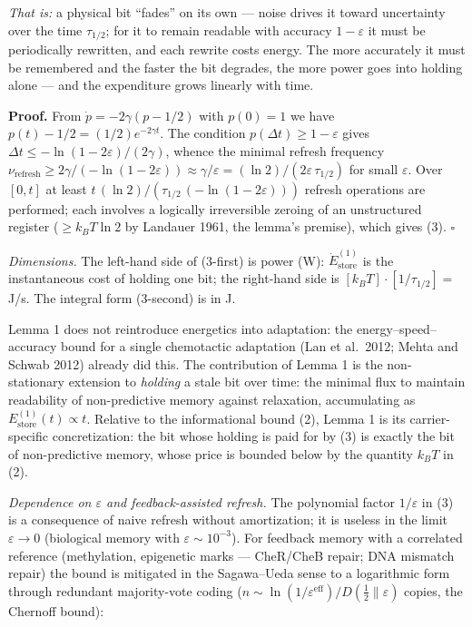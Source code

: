 \documentclass[pdflatex,sn-mathphys-ay]{sn-jnl}
\begin{document}
\emph{That is:} a physical bit ``fades'' on its own --- noise drives it toward uncertainty over the time \(\tau_{1/2}\); for it to remain readable with accuracy \(1-\varepsilon\) it must be periodically rewritten, and each rewrite costs energy. The more accurately it must be remembered and the faster the bit degrades, the more power goes into holding alone --- and the expenditure grows linearly with time.



\textbf{Proof.} From \(\dot p = -2\gamma(p - 1/2)\) with \(p(0) = 1\) we have \(p(t) - 1/2 = (1/2) e^{-2\gamma t}\). The condition \(p(\Delta t) \ge 1 - \varepsilon\) gives \(\Delta t \le -\ln(1 - 2\varepsilon)/(2\gamma)\), whence the minimal refresh frequency \(\nu_{\text{refresh}} \ge 2\gamma/(-\ln(1 - 2\varepsilon)) \approx \gamma/\varepsilon = (\ln 2)/(2\varepsilon\, \tau_{1/2})\) for small \(\varepsilon\). Over \([0,t]\) at least \(t\,(\ln 2)/(\tau_{1/2}\,(-\ln(1 - 2\varepsilon)))\) refresh operations are performed; each involves a logically irreversible zeroing of an unstructured register (\(\ge k_B T \ln 2\) by Landauer 1961, the lemma's premise), which gives (3). \(\square\)



\emph{Dimensions.} The left-hand side of (3-first) is power (W): \(\dot E_{\text{store}}^{(1)}\) is the instantaneous cost of holding one bit; the right-hand side is \([k_B T] \cdot [1/\tau_{1/2}] =\) J/s. The integral form (3-second) is in J.



Lemma 1 does not reintroduce energetics into adaptation: the energy--speed--accuracy bound for a single chemotactic adaptation (Lan et al.~2012; Mehta and Schwab 2012) already did this. The contribution of Lemma 1 is the non-stationary extension to \emph{holding} a stale bit over time: the minimal flux to maintain readability of non-predictive memory against relaxation, accumulating as \(E_{\text{store}}^{(1)}(t) \propto t\). Relative to the informational bound (2), Lemma 1 is its carrier-specific concretization: the bit whose holding is paid for by (3) is exactly the bit of non-predictive memory, whose price is bounded below by the quantity \(k_B T\) in (2).



\emph{Dependence on \(\varepsilon\) and feedback-assisted refresh.} The polynomial factor \(1/\varepsilon\) in (3) is a consequence of naive refresh without amortization; it is useless in the limit \(\varepsilon \to 0\) (biological memory with \(\varepsilon \sim 10^{-3}\)). For feedback memory with a correlated reference (methylation, epigenetic marks --- CheR/CheB repair; DNA mismatch repair) the bound is mitigated in the Sagawa--Ueda sense to a logarithmic form through redundant majority-vote coding (\(n \sim \ln(1/\varepsilon^{\text{eff}})/D(\tfrac12\|\varepsilon)\) copies, the Chernoff bound):
\end{document}
